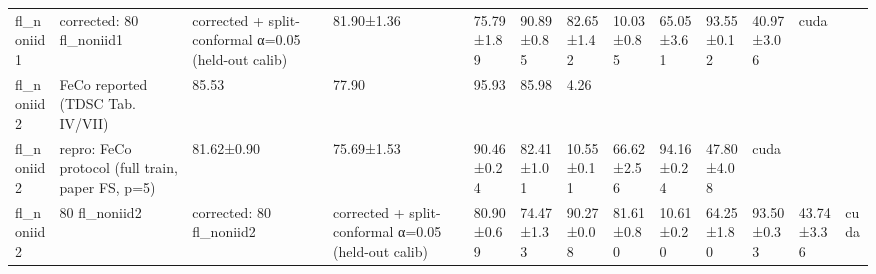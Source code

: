 \begin{tabular}{lllllllllll}
fl_noniid1 & corrected: 80%
fl_noniid1 & corrected + split-conformal α=0.05 (held-out calib) & 81.90±1.36 & 75.79±1.89 & 90.89±0.85 & 82.65±1.42 & 10.03±0.85 & 65.05±3.61 & 93.55±0.12 & 40.97±3.06 & cuda \\
fl_noniid2 & FeCo reported (TDSC Tab. IV/VII) & 85.53 & 77.90 & 95.93 & 85.98 & 4.26 &  &  &  &  \\
fl_noniid2 & repro: FeCo protocol (full train, paper FS, p=5) & 81.62±0.90 & 75.69±1.53 & 90.46±0.24 & 82.41±1.01 & 10.55±0.11 & 66.62±2.56 & 94.16±0.24 & 47.80±4.08 & cuda \\
fl_noniid2 & 80%
fl_noniid2 & corrected: 80%
fl_noniid2 & corrected + split-conformal α=0.05 (held-out calib) & 80.90±0.69 & 74.47±1.33 & 90.27±0.08 & 81.61±0.80 & 10.61±0.20 & 64.25±1.80 & 93.50±0.33 & 43.74±3.36 & cuda \\
\bottomrule
\end{tabular}
